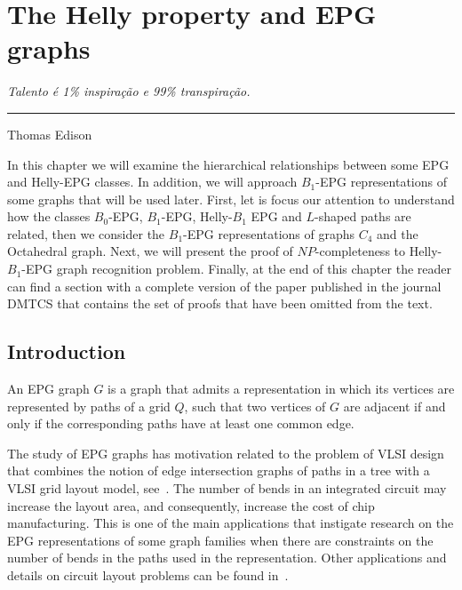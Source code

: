 \chapter{The Helly property and EPG graphs}\label{cap:capiii}

\begin{flushright}
\begin{minipage}[t][0cm][b]{0.47\textwidth}
\emph{
Talento é 1\% inspiração e 99\% transpiração. }
\end{minipage}

\rule[0cm]{7cm}{0.03cm}%

Thomas Edison
\end{flushright}


In this chapter we will examine the hierarchical relationships between some EPG and Helly-EPG classes. In addition, we will approach $ B_1$-EPG representations of some graphs that will be used later. First, let is focus our attention to understand how the classes $B_0$-EPG, $B_1$-EPG,  Helly-$B_1$ EPG and  $L$-shaped paths are related, then we consider the $ B_1$-EPG representations of graphs $C_4 $ and the Octahedral graph. Next, we will present the proof of $NP$-completeness to Helly-$B_1$-EPG graph recognition problem. Finally, at the end of this chapter the reader can find a section with a complete version of the paper published in the journal DMTCS that contains the set of proofs that have been omitted from the text.


\section{Introduction}
An EPG graph $G$ is a graph that admits a representation in which its vertices are represented by paths of a grid $Q$, such that two vertices of $G$ are adjacent if and only if the corresponding paths have at least one common edge.

The study of EPG graphs has motivation related to the problem of VLSI design that combines the notion of edge intersection graphs of paths in a  tree with a  VLSI  grid layout model, see~\cite{golumbic2009}. The number of bends in an integrated circuit may increase the layout area, and consequently, increase the cost of chip manufacturing.
This is one of the main applications that instigate research on the EPG representations of some graph families when there are constraints on the number of bends in the paths used in the representation.
Other applications and details on circuit layout problems can be found in~\cite{bandy1990, molitor1991}.

